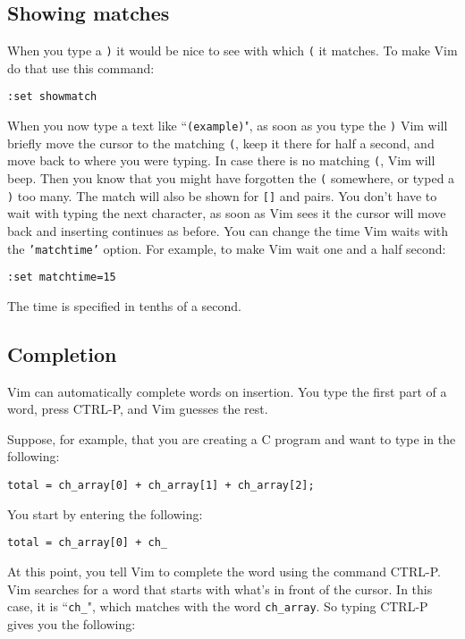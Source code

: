 \subsection{Showing matches}
When you type a \texttt{)} it would be nice to see with which \texttt{(} it matches.
To make Vim do that use this command:

\begin{Verbatim}[samepage=true]
 :set showmatch
\end{Verbatim}

When you now type a text like ``\texttt{(example)}", as soon as you type the \texttt{)} Vim will briefly move the cursor to the matching \texttt{(}, keep it there for half a second, and move back to where you were typing.
In case there is no matching \texttt{(}, Vim will beep.
Then you know that you might have forgotten the \texttt{(} somewhere, or typed a \texttt{)} too many.
The match will also be shown for \texttt{[]} and \texttt{{}} pairs.
You don't have to wait with typing the next character, as soon as Vim sees it the cursor will move back and inserting continues as before.
You can change the time Vim waits with the \texttt{'matchtime'} option.
For example, to make Vim wait one and a half second:

\begin{Verbatim}[samepage=true]
 :set matchtime=15
\end{Verbatim}

The time is specified in tenths of a second.
\subsection{Completion}
Vim can automatically complete words on insertion.
You type the first part of a word, press CTRL-P, and Vim guesses the rest.

Suppose, for example, that you are creating a C program and want to type in the following:

\begin{Verbatim}[samepage=true]
    total = ch_array[0] + ch_array[1] + ch_array[2]; 
\end{Verbatim}

You start by entering the following:

\begin{Verbatim}[samepage=true]
    total = ch_array[0] + ch_ 
\end{Verbatim}

At this point, you tell Vim to complete the word using the command CTRL-P.
Vim searches for a word that starts with what's in front of the cursor.
In this case, it is ``\texttt{ch\_}", which matches with the word \texttt{ch\_array}.
So typing CTRL-P gives you the following:

